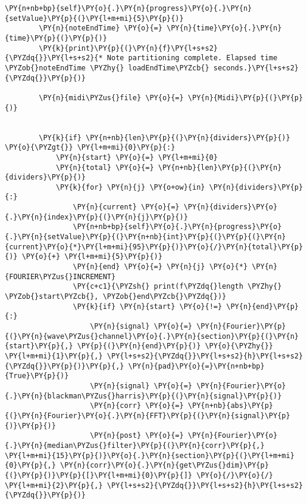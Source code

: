 \begin{Verbatim}[commandchars=\\\{\}]
        \PY{n+nb+bp}{self}\PY{o}{.}\PY{n}{progress}\PY{o}{.}\PY{n}{setValue}\PY{p}{(}\PY{l+m+mi}{5}\PY{p}{)}
        \PY{n}{noteEndTime} \PY{o}{=} \PY{n}{time}\PY{o}{.}\PY{n}{time}\PY{p}{(}\PY{p}{)}
        \PY{k}{print}\PY{p}{(}\PY{n}{f}\PY{l+s+s2}{\PYZdq{}}\PY{l+s+s2}{* Note partitioning complete. Elapsed time \PYZob{}noteEndTime \PYZhy{} loadEndTime\PYZcb{} seconds.}\PY{l+s+s2}{\PYZdq{}}\PY{p}{)}

        \PY{n}{midi\PYZus{}file} \PY{o}{=} \PY{n}{Midi}\PY{p}{(}\PY{p}{)}
        
        
        \PY{k}{if} \PY{n+nb}{len}\PY{p}{(}\PY{n}{dividers}\PY{p}{)} \PY{o}{\PYZgt{}} \PY{l+m+mi}{0}\PY{p}{:}
            \PY{n}{start} \PY{o}{=} \PY{l+m+mi}{0}
            \PY{n}{total} \PY{o}{=} \PY{n+nb}{len}\PY{p}{(}\PY{n}{dividers}\PY{p}{)}
            \PY{k}{for} \PY{n}{j} \PY{o+ow}{in} \PY{n}{dividers}\PY{p}{:}
                \PY{n}{current} \PY{o}{=} \PY{n}{dividers}\PY{o}{.}\PY{n}{index}\PY{p}{(}\PY{n}{j}\PY{p}{)}
                \PY{n+nb+bp}{self}\PY{o}{.}\PY{n}{progress}\PY{o}{.}\PY{n}{setValue}\PY{p}{(}\PY{n+nb}{int}\PY{p}{(}\PY{p}{(}\PY{n}{current}\PY{o}{*}\PY{l+m+mi}{95}\PY{p}{)}\PY{o}{/}\PY{n}{total}\PY{p}{)} \PY{o}{+} \PY{l+m+mi}{5}\PY{p}{)}
                \PY{n}{end} \PY{o}{=} \PY{n}{j} \PY{o}{*} \PY{n}{FOURIER\PYZus{}INCREMENT}
                \PY{c+c1}{\PYZsh{} print(f\PYZdq{}length \PYZhy{} \PYZob{}start\PYZcb{}, \PYZob{}end\PYZcb{}\PYZdq{})}
                \PY{k}{if} \PY{n}{start} \PY{o}{!=} \PY{n}{end}\PY{p}{:}
                    \PY{n}{signal} \PY{o}{=} \PY{n}{Fourier}\PY{p}{(}\PY{n}{wave\PYZus{}channel}\PY{o}{.}\PY{n}{section}\PY{p}{(}\PY{n}{start}\PY{p}{,} \PY{p}{(}\PY{n}{end}\PY{p}{)} \PY{o}{\PYZhy{}} \PY{l+m+mi}{1}\PY{p}{,} \PY{l+s+s2}{\PYZdq{}}\PY{l+s+s2}{h}\PY{l+s+s2}{\PYZdq{}}\PY{p}{)}\PY{p}{,} \PY{n}{pad}\PY{o}{=}\PY{n+nb+bp}{True}\PY{p}{)}
                    \PY{n}{signal} \PY{o}{=} \PY{n}{Fourier}\PY{o}{.}\PY{n}{blackman\PYZus{}harris}\PY{p}{(}\PY{n}{signal}\PY{p}{)}
                    \PY{n}{corr} \PY{o}{=} \PY{n+nb}{abs}\PY{p}{(}\PY{n}{Fourier}\PY{o}{.}\PY{n}{FFT}\PY{p}{(}\PY{n}{signal}\PY{p}{)}\PY{p}{)}
                    \PY{n}{post} \PY{o}{=} \PY{n}{Fourier}\PY{o}{.}\PY{n}{median\PYZus{}filter}\PY{p}{(}\PY{n}{corr}\PY{p}{,} \PY{l+m+mi}{15}\PY{p}{)}\PY{o}{.}\PY{n}{section}\PY{p}{(}\PY{l+m+mi}{0}\PY{p}{,} \PY{n}{corr}\PY{o}{.}\PY{n}{get\PYZus{}dim}\PY{p}{(}\PY{p}{)}\PY{p}{[}\PY{l+m+mi}{0}\PY{p}{]} \PY{o}{/}\PY{o}{/} \PY{l+m+mi}{2}\PY{p}{,} \PY{l+s+s2}{\PYZdq{}}\PY{l+s+s2}{h}\PY{l+s+s2}{\PYZdq{}}\PY{p}{)}


\end{Verbatim}

